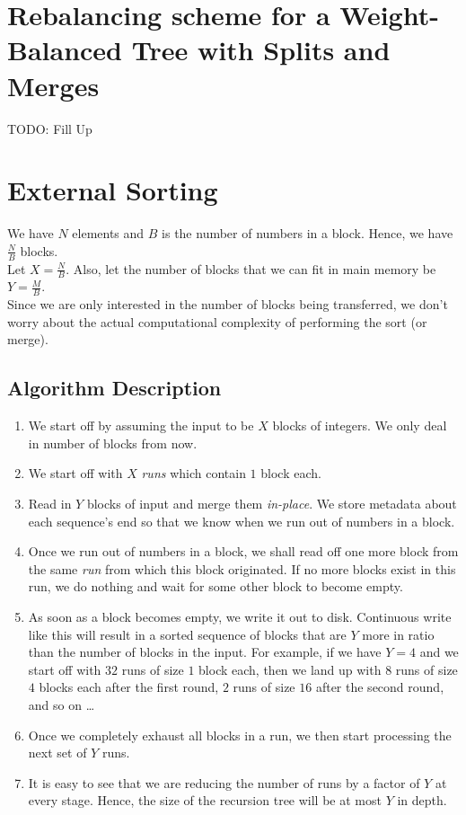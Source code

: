 \documentclass{article}
\begin{document}
\section {Rebalancing scheme for a Weight-Balanced Tree with Splits and Merges}
TODO: Fill Up

\clearpage

\section{External Sorting}

We have $N$ elements and $B$ is the number of numbers in a
block. Hence, we have $\frac{N}{B}$ blocks.\\ Let $X =
\frac{N}{B}$. Also, let the number of blocks that we can fit in main
memory be $Y = \frac{M}{B}$.
\\
Since we are only interested in the number of blocks being
transferred, we don't worry about the actual computational complexity
of performing the sort (or merge).\\

\subsection{Algorithm Description}

\begin{enumerate}
\item We start off by assuming the input to be $X$ blocks of
  integers. We only deal in number of blocks from now.
\item We start off with $X$ \textit{runs} which contain $1$ block
  each.
\item Read in $Y$ blocks of input and merge them
  \textit{in-place}. We store metadata about each sequence's end so
  that we know when we run out of numbers in a block.
\item Once we run out of numbers in a block, we shall read off one more
  block from the same \textit{run} from which this block
  originated. If no more blocks exist in this run, we do nothing and
  wait for some other block to become empty.
\item As soon as a block becomes empty, we write it out to
  disk. Continuous write like this will result in a sorted sequence of
  blocks that are $Y$ more in ratio than the number of blocks in the
  input. For example, if we have $Y = 4$ and we start off with $32$
  runs of size $1$ block each, then we land up with $8$ runs of size
  $4$ blocks each after the first round, $2$ runs of size $16$ after
  the second round, and so on \ldots{}
\item Once we completely exhaust all blocks in a run, we then start
  processing the next set of $Y$ runs.
\item It is easy to see that we are reducing the number of runs by a
  factor of $Y$ at every stage. Hence, the size of the recursion tree
  will be at most $Y$ in depth.
\end{enumerate}
\end{document}
